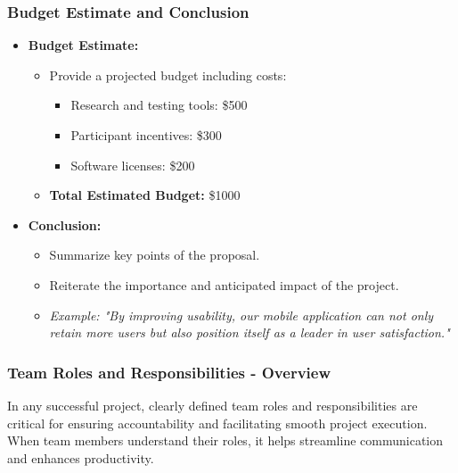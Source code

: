 \documentclass{beamer}
\begin{document}
\begin{frame}[fragile]
    \frametitle{Budget Estimate and Conclusion}
    \begin{itemize}
        \item \textbf{Budget Estimate:}
        \begin{itemize}
            \item Provide a projected budget including costs:
            \begin{itemize}
                \item Research and testing tools: \$500
                \item Participant incentives: \$300
                \item Software licenses: \$200
            \end{itemize}
            \item \textbf{Total Estimated Budget:} \$1000
        \end{itemize}

        \item \textbf{Conclusion:}
        \begin{itemize}
            \item Summarize key points of the proposal.
            \item Reiterate the importance and anticipated impact of the project.
            \item \textit{Example: "By improving usability, our mobile application can not only retain more users but also position itself as a leader in user satisfaction."}
        \end{itemize}
    \end{itemize}
\end{frame}

\begin{frame}[fragile]
    \frametitle{Team Roles and Responsibilities - Overview}
    In any successful project, clearly defined team roles and responsibilities are critical for ensuring accountability and facilitating smooth project execution. 
    When team members understand their roles, it helps streamline communication and enhances productivity.
\end{frame}
\end{document}
